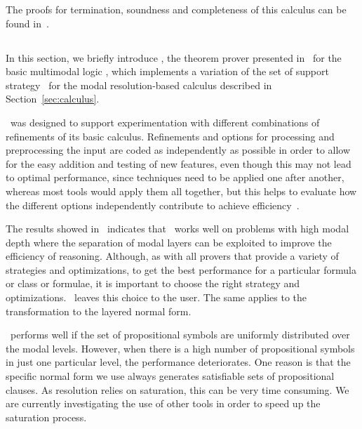 The proofs for termination, soundness and completeness of this calculus can be
found in~\cite{nalon2015modal}.

\subsection{\ksp}
In this section, we briefly introduce \ksp, the theorem prover presented
in~\cite{Nalon2016} for the basic multimodal logic , which
implements a variation of the set of support strategy~\cite{wos1965efficiency}
for the modal resolution-based calculus described in Section~\ref{sec:calculus}.

\ksp\ was designed to support experimentation with different combinations of
refinements of its basic calculus. Refinements and options for processing and
preprocessing the input are coded as independently as possible in order to allow
for the easy addition and testing of new features, even though this may not lead
to optimal performance, since techniques need to be applied one after another,
whereas most tools would apply them all together, but this helps to evaluate how
the different options independently contribute to achieve
efficiency~\cite{Nalon2016}. 

The results showed in~\cite{Nalon2016} indicates that \ksp\ works well on
problems with high modal depth where the separation of modal layers can be
exploited to improve the efficiency of reasoning. Although, as with all provers
that provide a variety of strategies and optimizations, to get the best
performance for a particular formula or class or formulae, it is important to
choose the right strategy and optimizations. \ksp\ leaves this choice to the
user. The same applies to the transformation to the layered normal form.

\ksp\ performs well if the set of propositional symbols are uniformly
distributed over the modal levels. However, when there is a high number of
propositional symbols in just one particular level, the performance
deteriorates. One reason is that the specific normal form we use always
generates satisfiable sets of propositional clauses. As resolution relies on
saturation, this can be very time consuming. We are currently investigating the
use of other tools in order to speed up the saturation process.
